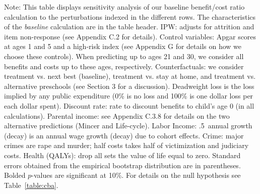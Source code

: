 \documentclass[static]{JJH-Beamer}
\begin{document}
{\flushleft \small Note: This table displays sensitivity analysis of our baseline benefit/cost ratio calculation to the perturbations indexed in the different rows. The characteristics of the \textit{baseline} calculation are in the table header. IPW: adjusts for attrition and item non-response (see Appendix C.2 for details). Control variables: Apgar scores at ages 1 and 5 and a high-risk index (see Appendix G for details on how we choose these controls). When predicting up to ages 21 and 30, we consider all benefits and costs up to these ages, respectively. Counterfactuals: we consider treatment vs. next best (baseline), treatment vs. stay at home, and treatment vs. alternative preschools (see Section 3 for a discussion). Deadweight loss is the loss implied by any public expenditure (0\% is no loss and 100\% is one dollar loss per each dollar spent). Discount rate: rate to discount benefits to child's age 0 (in all calculations). Parental income: see Appendix C.3.8 for details on the two alternative predictions (Mincer and Life-cycle). Labor Income: .5\ annual growth (decay) is an annual wage growth (decay) due to cohort effects. Crime: major crimes are rape and murder; half costs takes half of victimization and judiciary costs. Health (QALYs): drop all sets the value of life equal to zero. Standard errors obtained from the empirical bootstrap distribution are in parentheses. Bolded $p$-values are significant at 10\%. For details on the null hypothesis see Table~\ref{table:cba}.\\}
\clearpage
\end{document}
